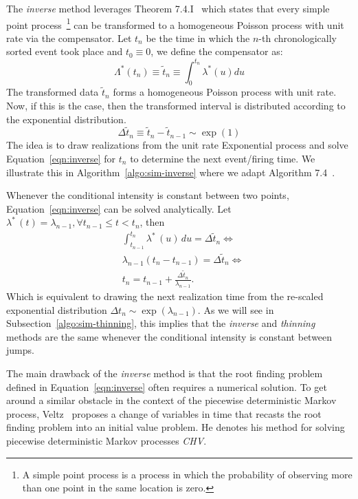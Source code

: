 \documentclass{juliacon}
\numberwithin{equation}{section}
\begin{document}
The \textit{inverse} method leverages Theorem 7.4.I~\cite{daley2003} which states that every simple point process~\footnote{A simple point process is a process in which the probability of observing more than one point in the same location is zero.} can be transformed to a homogeneous Poisson process with unit rate via the compensator. Let \( t_n \) be the time in which the \( n \)-th chronologically sorted event took place and \( t_0 \equiv 0 \), we define the compensator as:
\begin{equation} \label{eqn:compensator}
  \Lambda^\ast (t_n) \equiv \tilde{t}_n \equiv \int_0^{t_n} \lambda^\ast (u) du
\end{equation}
The transformed data \( \tilde{t}_n \) forms a homogeneous Poisson process with unit rate. Now, if this is the case, then the transformed interval is distributed according to the exponential distribution.
\begin{equation}\label{eqn:inverse}
  \Delta \tilde{t}_n \equiv \tilde{t}_n - \tilde{t}_{n-1} \sim \exp(1)
\end{equation}
The idea is to draw realizations from the unit rate Exponential process and solve Equation~\ref{eqn:inverse} for \( t_n \)  to determine the next event/firing time. We illustrate this in Algorithm~\ref{algo:sim-inverse} where we adapt Algorithm 7.4~\cite{daley2003}.

Whenever the conditional intensity is constant between two points, Equation~\ref{eqn:inverse} can be solved analytically. Let \( \lambda^\ast \, (t) = \lambda_{n-1} , \forall t_{n-1} \leq t < t_n \), then
\begin{equation}
\begin{split}
  &\int_{t_{n-1}}^{t_n} \lambda^\ast \, (u) \, du = \Delta \tilde{t}_{n} \iff \\
  &\lambda_{n-1} (t_n - t_{n-1}) = \Delta \tilde{t}_n \iff \\
  &t_n = t_{n-1} + \frac{\Delta \tilde{t}_n}{\lambda_{n-1}}.
\end{split}
\end{equation}
Which is equivalent to drawing the next realization time from the re-scaled exponential distribution \( \Delta t_n \sim \exp(\lambda_{n-1}) \). As we will see in Subsection~\ref{algo:sim-thinning}, this implies that the \textit{inverse} and \textit{thinning} methods are the same whenever the conditional intensity is constant between jumps.

The main drawback of the \textit{inverse} method is that the root finding problem defined in Equation~\ref{eqn:inverse} often requires a numerical solution. To get around a similar obstacle in the context of the piecewise deterministic Markov process, Veltz~\cite{veltz2015} proposes a change of variables in time that recasts the root finding problem into an initial value problem. He denotes his method for solving piecewise deterministic Markov processes \textit{CHV}.
\end{document}

